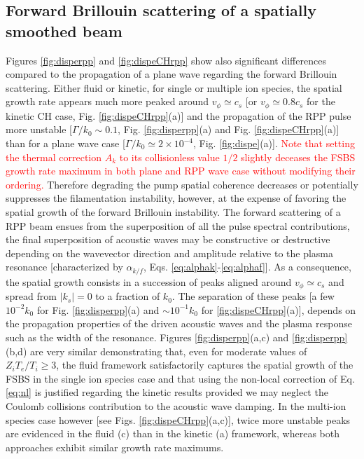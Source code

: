 \documentclass[
 reprint,
 superscriptaddress,
 amsmath,amssymb,
 aps,
]{revtex4-1}
\def\tc{\textcolor{red}}
\begin{document}
\subsection{Forward Brillouin scattering of a  spatially smoothed beam}
Figures \ref{fig:disperpp} and \ref{fig:dispeCHrpp} show also significant differences compared to the propagation of a plane wave  regarding the forward Brillouin scattering.  
Either fluid or kinetic, for single or multiple ion species, 
the spatial growth rate appears much more peaked around $v_\phi\simeq c_s$ [or $v_\phi\simeq 0.8c_s$ for  the kinetic CH case, Fig. \ref{fig:dispeCHrpp}(a)] and the propagation of the RPP pulse more unstable  [$\Gamma/k_0\sim 0.1$, Fig.  \ref{fig:disperpp}(a) and Fig.  \ref{fig:dispeCHrpp}(a)]  than for a plane wave case  [$\Gamma/k_0\simeq 2 \times 10^{-4}$, Fig.  \ref{fig:dispe}(a)].
\tc{Note that setting the thermal correction $A_k$ to its collisionless value $1/2$  slightly deceases the FSBS growth rate maximum in both plane and RPP wave case without modifying their ordering.  }
Therefore degrading the pump spatial coherence decreases or potentially suppresses the filamentation instability, however, at the expense of favoring the  spatial growth of the forward Brillouin instability.
The forward scattering of a RPP beam ensues from the superposition of all the pulse spectral contributions, the final superposition of acoustic waves may be constructive or destructive depending on the wavevector direction and amplitude relative to the plasma resonance [characterized by $\alpha_{k/f}$, Eqs. \eqref{eq:alphak}-\eqref{eq:alphaf}]. 
As a consequence, the spatial growth consists in a succession of peaks aligned around $v_\phi\simeq c_s$ and spread from $\vert k_s\vert=0$ to a fraction of $k_0$. The separation of these peaks [a few $ 10^{-2}k_0$ for Fig. \ref{fig:disperpp}(a) and $\sim 10^{-1}k_0$ for \ref{fig:dispeCHrpp}(a)], depends on the propagation properties of the driven acoustic waves and the plasma response such as the width of the resonance. 
Figures \ref{fig:disperpp}(a,c) and  \ref{fig:disperpp}(b,d) are very similar demonstrating that, even for moderate values of $Z_iT_e/T_i\ge3$, the fluid framework satisfactorily captures the spatial growth of the FSBS in the single ion species case and that using the non-local correction of Eq. \eqref{eq:nl} is justified regarding the kinetic results provided we may neglect the Coulomb collisions contribution to the acoustic wave damping.
In the multi-ion species case however [see Figs. \ref{fig:dispeCHrpp}(a,c)],
twice more unstable peaks are evidenced in the fluid  (c) than in the kinetic (a) framework, whereas both approaches exhibit  similar growth rate maximums. 
\end{document}
